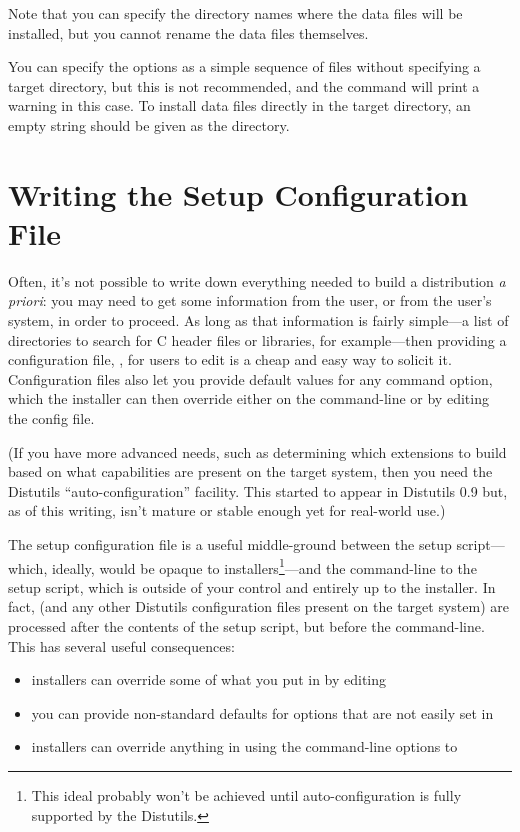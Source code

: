 \documentclass{howto}
\begin{document}
Note that you can specify the directory names where the data files
will be installed, but you cannot rename the data files themselves.

You can specify the  options as a simple sequence
of files without specifying a target directory, but this is not recommended,
and the  command will print a warning in this case.
To install data files directly in the target directory, an empty
string should be given as the directory.


\section{Writing the Setup Configuration File}
\label{setup-config}

Often, it's not possible to write down everything needed to build a
distribution \emph{a priori}: you may need to get some information from
the user, or from the user's system, in order to proceed.  As long as
that information is fairly simple---a list of directories to search for
C header files or libraries, for example---then providing a
configuration file, , for users to edit is a cheap and
easy way to solicit it.  Configuration files also let you provide
default values for any command option, which the installer can then
override either on the command-line or by editing the config file.

(If you have more advanced needs, such as determining which extensions
to build based on what capabilities are present on the target system,
then you need the Distutils ``auto-configuration'' facility.  This
started to appear in Distutils 0.9 but, as of this writing, isn't mature 
or stable enough yet for real-world use.)


The setup configuration file is a useful middle-ground between the setup
script---which, ideally, would be opaque to installers\footnote{This
  ideal probably won't be achieved until auto-configuration is fully
  supported by the Distutils.}---and the command-line to the setup
script, which is outside of your control and entirely up to the
installer.  In fact,  (and any other Distutils
configuration files present on the target system) are processed after
the contents of the setup script, but before the command-line.  This has 
several useful consequences:
\begin{itemize}
\item installers can override some of what you put in  by
  editing 
\item you can provide non-standard defaults for options that are not
  easily set in 
\item installers can override anything in  using the
  command-line options to 
\end{itemize}
\end{document}
